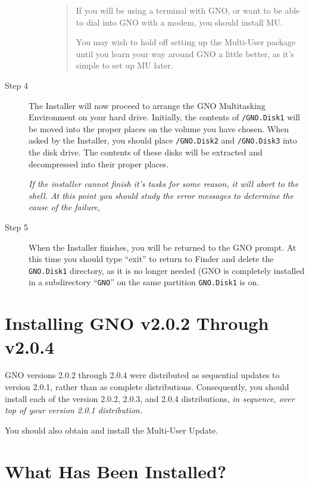 \documentclass{report}
\begin{document}
\begin{description}
\begin{description}
\begin{quote}
	If you will be using a terminal with GNO, or want to be able to dial
        into GNO with a modem, you should install MU.
        
	You may wish to hold off setting up the Multi-User package until you
        learn your way around GNO a little better, as it's simple
        to set up MU later.

	\end{quote}

\end{description}

\item[Step 4]

The Installer will now proceed to arrange the GNO Multitasking
Environment on your hard drive. Initially, the contents of
\texttt{/GNO.Disk1} will be moved into the proper places on the
volume you have chosen. When asked by the Installer, you should place
\texttt{/GNO.Disk2} and \texttt{/GNO.Disk3} into the disk drive. The
contents of these disks will be extracted and decompressed into their
proper places.

\em
If the installer cannot finish it's tasks for some reason, it will
abort to the shell. At this point you should study the error messages
to determine the cause of the failure, 
\rm

\item[Step 5]

When the Installer finishes, you will be returned to the GNO prompt.
At this time you should type ``exit'' to return to Finder and delete
the \texttt{GNO.Disk1} directory, as it is no longer needed (GNO
is completely installed in a subdirectory ``\texttt{GNO}'' on the
same partition \texttt{GNO.Disk1} is on.

\end{description}

\section{Installing GNO v2.0.2 Through v2.0.4}

GNO versions 2.0.2 through 2.0.4 were distributed as sequential
updates to version 2.0.1, rather than as complete distributions.
Consequently, you should install each of the version 2.0.2,
2.0.3, and 2.0.4 distributions, \em in sequence, \rm over top of your
version 2.0.1 distribution.

You should also obtain and install the Multi-User Update.

\section{What Has Been Installed?}
\end{document}
